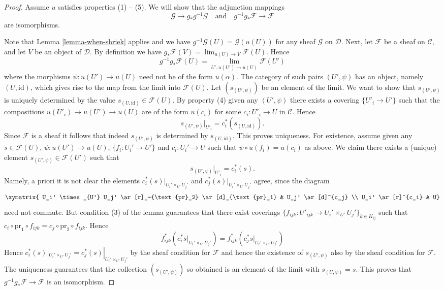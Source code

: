 \begin{proof}
Assume $u$ satisfies properties (1) -- (5). We will show that
the adjunction mappings
$$
\mathcal{G} \longrightarrow g_*g^{-1}\mathcal{G}
\quad\text{and}\quad
g^{-1}g_*\mathcal{F} \longrightarrow \mathcal{F}
$$
are isomorphisms.

\medskip\noindent
Note that Lemma \ref{lemma-when-shriek} applies and we have
$g^{-1}\mathcal{G}(U) = \mathcal{G}(u(U))$ for any sheaf $\mathcal{G}$
on $\mathcal{D}$. Next, let $\mathcal{F}$ be a sheaf on $\mathcal{C}$,
and let $V$ be an object of $\mathcal{D}$. By definition we have
$g_*\mathcal{F}(V) = \lim_{u(U) \to V} \mathcal{F}(U)$.
Hence
$$
g^{-1}g_*\mathcal{F}(U) = \lim_{U', u(U') \to u(U)} \mathcal{F}(U')
$$
where the morphisms $\psi : u(U') \to u(U)$ need not be of the form
$u(\alpha)$. The category of such pairs $(U', \psi)$ has an
object, namely $(U, \text{id})$, which gives rise to the map from
the limit into $\mathcal{F}(U)$. Let $(s_{(U', \psi)})$ be an element
of the limit. We want to show that $s_{(U', \psi)}$ is uniquely determined
by the value $s_{(U, \text{id})} \in \mathcal{F}(U)$. By property (4) given
any $(U', \psi)$ there exists a covering $\{U'_i \to U'\}$ such that the
compositions $u(U'_i) \to u(U') \to u(U)$ are of the form $u(c_i)$
for some $c_i : U'_i \to U$ in $\mathcal{C}$. Hence
$$
s_{(U', \psi)}|_{U'_i} = c_i^*(s_{(U, \text{id})}).
$$
Since $\mathcal{F}$ is a sheaf it follows that indeed $s_{(U', \psi)}$
is determined by $s_{(U, \text{id})}$. This proves uniqueness.
For existence, assume given any
$s \in \mathcal{F}(U)$, $\psi : u(U') \to u(U)$, $\{f_i : U_i' \to U'\}$
and $c_i : U_i' \to U$ such that $\psi \circ u(f_i) = u(c_i)$ as above.
We claim there exists a (unique) element
$s_{(U', \psi)} \in \mathcal{F}(U')$ such that
$$
s_{(U', \psi)}|_{U'_i} = c_i^*(s).
$$
Namely, a priori it is not clear the elements
$c_i^*(s)|_{U_i' \times_{U'} U_j'}$
and $c_j^*(s)|_{U_i' \times_{U'} U_j'}$ agree, since
the diagram
$$
\xymatrix{
U_i' \times_{U'} U_j' \ar[r]_-{\text{pr}_2} \ar[d]_{\text{pr}_1} &
U_j' \ar[d]^{c_j} \\
U_i' \ar[r]^{c_i} & U}
$$
need not commute. But condition (3) of the lemma guarantees that there
exist coverings
$\{f_{ijk} : U'_{ijk} \to U_i' \times_{U'} U_j'\}_{k \in K_{ij}}$ such that
$c_i \circ \text{pr}_1 \circ f_{ijk} = c_j \circ \text{pr}_2 \circ f_{ijk}$.
Hence
$$
f_{ijk}^* \left(c_i^*s|_{U_i' \times_{U'} U_j'}\right)
=
f_{ijk}^* \left(c_j^*s|_{U_i' \times_{U'} U_j'}\right)
$$
Hence $c_i^*(s)|_{U_i' \times_{U'} U_j'} = c_j^*(s)|_{U_i' \times_{U'} U_j'}$
by the sheaf condition for $\mathcal{F}$ and hence the existence of
$s_{(U', \psi)}$ also by the sheaf condition for $\mathcal{F}$. The uniqueness
guarantees that the collection $(s_{(U', \psi)})$ so obtained is an element
of the limit with $s_{(U, \psi)} = s$. This proves
that $g^{-1}g_*\mathcal{F} \to \mathcal{F}$ is an isomorphism.


\end{proof}
